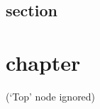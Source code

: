 \documentclass{book}
\newcommand{\Texinfothechapterheading}{}
\newcommand{\Texinfoheadingchaptername}{\chaptername}
\newcommand{\Texinfochapter}[1]{\chapter{#1}
\renewcommand{\Texinfothechapterheading}{\Texinfoheadingchaptername{} \thechapter{} }%
}%
\renewcommand{\_}{\Texinfounderscore\discretionary{}{}{}}
\begin{document}
\section{{section}}
\label{anchor:section-node}%

\Texinfochapter{{chapter}}
\label{anchor:chapter-node}%


\label{anchor:Top}%

(`Top' node ignored)
\end{document}
